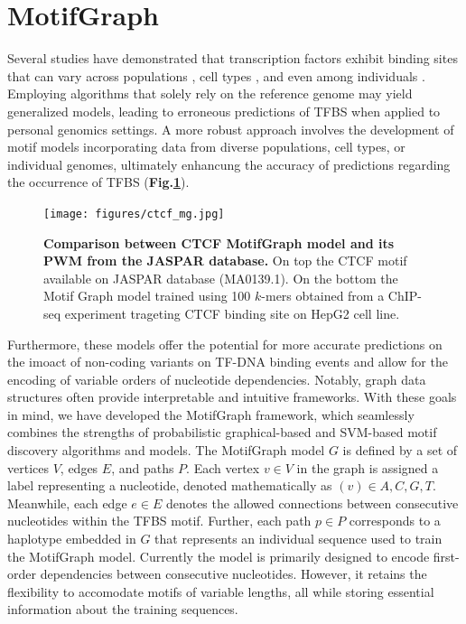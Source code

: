 \documentclass[a4paper, titlepage, openright]{book}
\newcommand{\mychapter}[2]{
    \setcounter{chapter}{#1}
    \setcounter{section}{0}
    \chapter*{#2}
    \addcontentsline{toc}{chapter}{#2}
}
\newcommand{\motifgraph}{MotifGraph\xspace}
\begin{document}
\mychapter{3}{\motifgraph}
Several studies have demonstrated that transcription factors exhibit binding sites that can vary across populations \citep{kasowski2010variation}, cell types \citep{arvey2012sequence, gertz2013distinct}, and even among individuals  \citep{tognon2021grafimo}. Employing algorithms that solely rely on the reference genome may yield generalized models, leading to erroneous predictions of TFBS when applied to personal genomics settings. A more robust approach involves the development of motif models incorporating data from diverse populations, cell types, or individual genomes, ultimately enhancung the accuracy of predictions regarding the occurrence of TFBS (\textbf{Fig.\ref{fig:ctcf_mg}}).
\begin{figure}
	\centering
	\texttt{[image: figures/ctcf\_mg.jpg]}
	\caption[Comparison between CTCF Motif Graph model and its PWM from the JASPAR database.]{\textbf{Comparison between CTCF MotifGraph model and its PWM from the JASPAR database.} On top the CTCF motif available on JASPAR database (MA0139.1). On the bottom the Motif Graph model trained using 100 $k$-mers obtained from a ChIP-seq experiment trageting CTCF binding site on HepG2 cell line.}
	\label{fig:ctcf_mg}
\end{figure} 
Furthermore, these models offer the potential for more accurate predictions on the imoact of non-coding variants on TF-DNA binding events and allow for the encoding of variable orders of nucleotide dependencies. Notably, graph data structures often provide interpretable and intuitive frameworks. With these goals in mind, we have developed the \motifgraph framework, which seamlessly combines the strengths of probabilistic graphical-based and SVM-based motif discovery algorithms and models. The \motifgraph model $G$ is defined by a set of vertices $V$,  edges $E$, and paths $P$. Each vertex $v \in V$ in the graph is assigned a label representing a nucleotide, denoted mathematically as $(v) \in {A, C, G, T}$.  Meanwhile, each edge $e \in E$ denotes the allowed connections between consecutive nucleotides within the TFBS motif. Further, each path $p \in P$ corresponds to a haplotype embedded in $G$ that represents an individual sequence used to train the \motifgraph model. Currently the model is primarily designed to encode first-order dependencies between consecutive nucleotides. However, it retains the flexibility to accomodate motifs of variable lengths, all while storing essential information about the training sequences.
\end{document}
